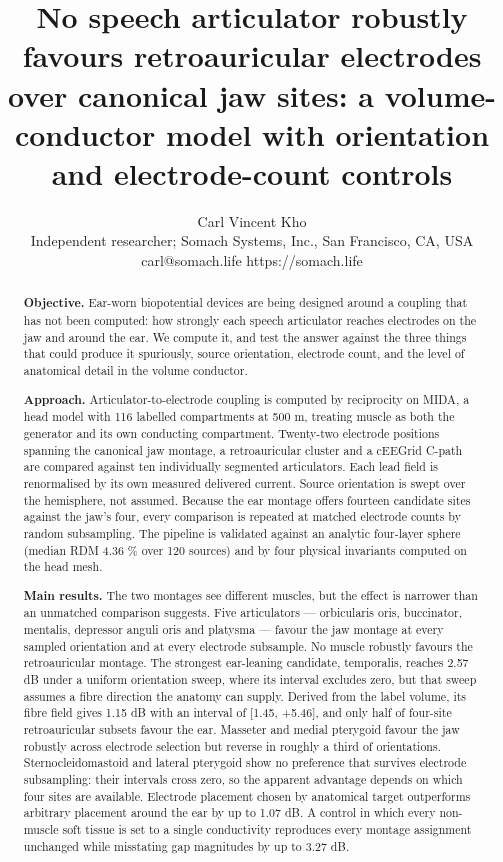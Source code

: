 \documentclass[
  11pt,
  a4paper,
]{article}
\title{No speech articulator robustly favours retroauricular electrodes over canonical jaw sites: a volume-conductor model with orientation and electrode-count controls}
\author{Carl Vincent Kho \\ Independent researcher; Somach Systems, Inc., San Francisco, CA, USA \\ carl@somach.life \textperiodcentered{} https://somach.life}
\date{}
\begin{document}
\maketitle

\begin{abstract}


\textbf{Objective.} Ear-worn biopotential devices are being designed around a
coupling that has not been computed: how strongly each speech articulator
reaches electrodes on the jaw and around the ear. We compute it, and test the
answer against the three things that could produce it spuriously, source
orientation, electrode count, and the level of anatomical detail in the volume
conductor.

\textbf{Approach.} Articulator-to-electrode coupling is computed by reciprocity on
MIDA, a head model with 116 labelled compartments at 500 \textmu{}m, treating muscle as
both the generator and its own conducting compartment. Twenty-two electrode
positions spanning the canonical jaw montage, a retroauricular cluster and a
cEEGrid C-path are compared against ten individually segmented articulators.
Each lead field is renormalised by its own measured delivered current. Source
orientation is swept over the hemisphere, not assumed. Because the ear
montage offers fourteen candidate sites against the jaw's four, every comparison
is repeated at matched electrode counts by random subsampling. The pipeline is
validated against an analytic four-layer sphere (median RDM 4.36 \% over 120
sources) and by four physical invariants computed on the head mesh.

\textbf{Main results.} The two montages see different muscles, but the effect is
narrower than an unmatched comparison suggests. Five articulators ---
orbicularis oris, buccinator, mentalis, depressor anguli oris and platysma ---
favour the jaw montage at every sampled orientation and at every electrode
subsample. No muscle robustly favours the retroauricular montage. The
strongest ear-leaning candidate, temporalis, reaches \textminus{}2.57 dB under a uniform
orientation sweep, where its interval excludes zero, but that sweep assumes a
fibre direction the anatomy can supply. Derived from the label volume, its fibre
field gives \textminus{}1.15 dB with an interval of {[}\textminus{}1.45, +5.46{]}, and only half of
four-site retroauricular subsets favour the ear. Masseter and medial pterygoid
favour the jaw robustly across electrode selection but reverse in roughly a
third of orientations. Sternocleidomastoid and lateral pterygoid show no
preference that survives electrode subsampling: their intervals cross zero, so
the apparent advantage depends on which four sites are available. Electrode
placement chosen by anatomical target outperforms arbitrary placement around
the ear by up to 1.07 dB. A control in which every non-muscle soft tissue is
set to a single conductivity reproduces every montage assignment unchanged
while misstating gap magnitudes by up to 3.27 dB.


\end{abstract}
\end{document}
